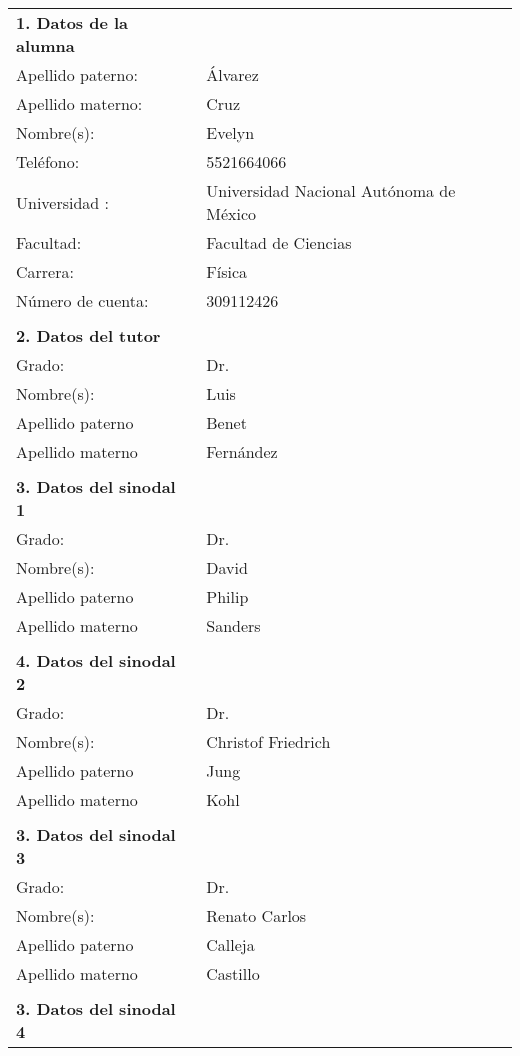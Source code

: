 
\begin{tabular}{ll}
\textbf{1. Datos de la alumna}	&  \\ 
Apellido paterno:	& Álvarez  \\ 
Apellido materno:	& Cruz \\ 
Nombre(s):	& Evelyn \\ 
Teléfono:	& 5521664066 \\ 
Universidad	:& Universidad Nacional Autónoma de México  \\ 
Facultad:	& Facultad de Ciencias  \\ 
Carrera:	& Física \\ 
Número de cuenta:	& 309112426 \\ 
	&  \\ 
\textbf{2. Datos del tutor	}&  \\ 
Grado:	&  Dr.\\ 
Nombre(s):	&  Luis\\ 
Apellido paterno	& Benet \\ 
Apellido materno	&  Fernández\\ 
	&  \\ 
\textbf{3. Datos del sinodal 1	}&  \\ 
Grado:	&  Dr.\\ 
Nombre(s):	&  David\\ 
Apellido paterno	& Philip\\ 
Apellido materno	&  Sanders\\ 
	&  \\ 
\textbf{4. Datos del sinodal 2	}&  \\ 
Grado:	&  Dr.\\ 
Nombre(s):	&  Christof Friedrich\\ 
Apellido paterno	& Jung\\ 
Apellido materno	&  Kohl\\ 
&  \\
\textbf{3. Datos del sinodal 3	}&  \\ 
Grado:	&  Dr.\\ 
Nombre(s):	&  Renato Carlos\\ 
Apellido paterno	& Calleja\\ 
Apellido materno	&  Castillo\\ 
&  \\  
\textbf{3. Datos del sinodal 4	}&  \\ 

\end{tabular}
